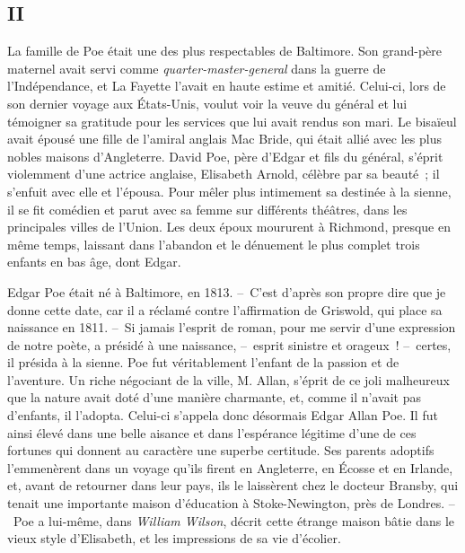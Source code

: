 \documentclass[french,twoside]{book} %
\begin{document}
\subsection[{II}]{II}
\noindent La famille de Poe était une des plus respectables de Baltimore. Son grand-père maternel avait servi comme \emph{quarter-master-general} dans la guerre de l’Indépendance, et La Fayette l’avait en haute estime et amitié. Celui-ci, lors de son dernier voyage aux États-Unis, voulut voir la veuve du général et lui témoigner sa gratitude pour les services que lui avait rendus son mari. Le bisaïeul avait épousé une fille de l’amiral anglais Mac Bride, qui était allié avec les plus nobles maisons d’Angleterre. David Poe, père d’Edgar et fils du général, s’éprit violemment d’une actrice anglaise, Elisabeth Arnold, célèbre par sa beauté ; il s’enfuit avec elle et l’épousa. Pour mêler plus intimement sa destinée à la sienne, il se fit comédien et parut avec sa femme sur différents théâtres, dans les principales villes de l’Union. Les deux époux moururent à Richmond, presque en même temps, laissant dans l’abandon et le dénuement le plus complet trois enfants en bas âge, dont Edgar.\par
Edgar Poe était né à Baltimore, en 1813. – C’est d’après son propre dire que je donne cette date, car il a réclamé contre l’affirmation de Griswold, qui place sa naissance en 1811. – Si jamais l’esprit de roman, pour me servir d’une expression de notre poète, a présidé à une naissance, – esprit sinistre et orageux ! – certes, il présida à la sienne. Poe fut véritablement l’enfant de la passion et de l’aventure. Un riche négociant de la ville, M. Allan, s’éprit de ce joli malheureux que la nature avait doté d’une manière charmante, et, comme il n’avait pas d’enfants, il l’adopta. Celui-ci s’appela donc désormais Edgar Allan Poe. Il fut ainsi élevé dans une belle aisance et dans l’espérance légitime d’une de ces fortunes qui donnent au caractère une superbe certitude. Ses parents adoptifs l’emmenèrent dans un voyage qu’ils firent en Angleterre, en Écosse et en Irlande, et, avant de retourner dans leur pays, ils le laissèrent chez le docteur Bransby, qui tenait une importante maison d’éducation à Stoke-Newington, près de Londres. – Poe a lui-même, dans \emph{William Wilson}, décrit cette étrange maison bâtie dans le vieux style d’Elisabeth, et les impressions de sa vie d’écolier.\par
\end{document}
